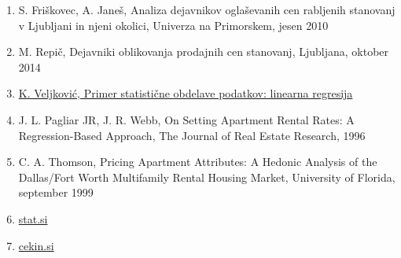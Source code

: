 \documentclass[a4paper, 12pt]{article}
\begin{document}
\begin{enumerate}
	\item S. Friškovec, A. Janeš, Analiza dejavnikov oglaševanih cen rabljenih
		stanovanj v Ljubljani in njeni okolici, Univerza na Primorskem, jesen 2010
	\item M. Repič, Dejavniki oblikovanja prodajnih cen stanovanj, Ljubljana,
		oktober 2014
	\item \href{https://gitlab.com/ul-fri/ovs/projekt/-/blob/master/regresija.pdf}
		{K. Veljković, Primer statistične obdelave podatkov: linearna regresija}
	\item J. L. Pagliar JR, J. R. Webb, On Setting Apartment Rental Rates: A
		Regression-Based Approach, The Journal of Real Estate Research, 1996
	\item C. A. Thomson, Pricing Apartment Attributes: A Hedonic Analysis of the
		Dallas/Fort Worth Multifamily Rental Housing Market, University of Florida,
		september 1999
	\item \href{https://www.stat.si/statweb/News/Index/7570}{stat.si}
	\item \href{https://cekin.si/nepremicnine/trnova-pot-do-lastnega-doma-zakaj-mora-biti-tako.html}{cekin.si}
\end{enumerate}
\end{document}
